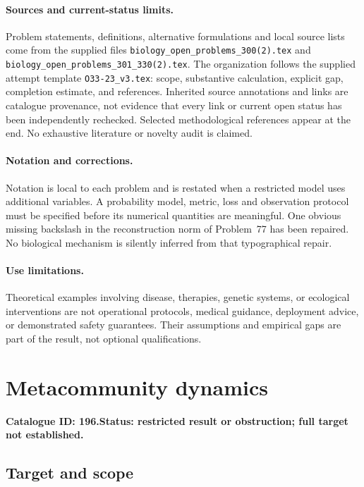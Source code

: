 \documentclass[11pt]{article}
\begin{document}
\paragraph{Sources and current-status limits.}
Problem statements, definitions, alternative formulations and local source lists
come from the supplied files
\texttt{biology\_open\_problems\_300(2).tex} and
\texttt{biology\_open\_problems\_301\_330(2).tex}.
The organization follows the supplied attempt template
\texttt{O33-23\_v3.tex}: scope, substantive calculation, explicit gap,
completion estimate, and references. Inherited source annotations and links are
catalogue provenance, not evidence that every link or current open status has
been independently rechecked. Selected methodological references appear at the
end. No exhaustive literature or novelty audit is claimed.

\paragraph{Notation and corrections.}
Notation is local to each problem and is restated when a restricted model uses
additional variables. A probability model, metric, loss and observation protocol
must be specified before its numerical quantities are meaningful. One obvious
missing backslash in the reconstruction norm of Problem~77 has been repaired.
No biological mechanism is silently inferred from that typographical repair.

\paragraph{Use limitations.}
Theoretical examples involving disease, therapies, genetic systems, or ecological
interventions are not operational protocols, medical guidance, deployment advice,
or demonstrated safety guarantees. Their assumptions and empirical gaps are part
of the result, not optional qualifications.

\setcounter{section}{195}
\section{Metacommunity dynamics}
\label{prob:196}
\noindent\textbf{Catalogue ID: 196.}\quad \textbf{Status: restricted result or obstruction; full target not established.}
\subsection{Target and scope}
\end{document}

